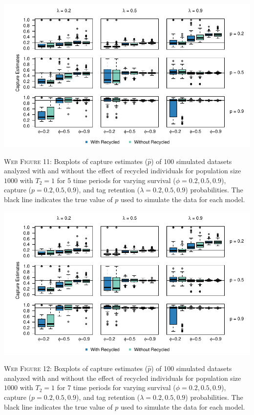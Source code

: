 \documentclass[]{article}
\begin{document}
\newpage

\includegraphics{Appendix_files/figure-latex/11_capture_GJSTL5-1.pdf}

\textsc{Web Figure 11:} Boxplots of capture estimates (\(\hat{p}\)) of
100 simulated datasets analyzed with and without the effect of recycled
individuals for population size \(1000\) with \(T_2=1\) for 5 time
periods for varying survival (\(\phi=0.2,0.5,0.9\)), capture
(\(p=0.2,0.5,0.9\)), and tag retention (\(\lambda=0.2,0.5,0.9\))
probabilities. The black line indicates the true value of \(p\) used to
simulate the data for each model.

\includegraphics{Appendix_files/figure-latex/12_capture_GJSTL6-1.pdf}

\textsc{Web Figure 12:} Boxplots of capture estimates (\(\hat{p}\)) of
100 simulated datasets analyzed with and without the effect of recycled
individuals for population size \(1000\) with \(T_2=1\) for 7 time
periods for varying survival (\(\phi=0.2,0.5,0.9\)), capture
(\(p=0.2,0.5,0.9\)), and tag retention (\(\lambda=0.2,0.5,0.9\))
probabilities. The black line indicates the true value of \(p\) used to
simulate the data for each model.
\end{document}
